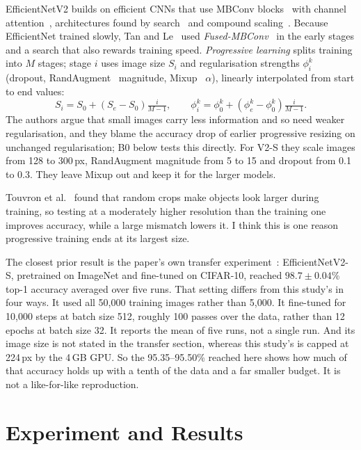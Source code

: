 \documentclass{COMPXXXX}
\begin{document}
EfficientNetV2 builds on efficient CNNs that use MBConv blocks~\cite{sandler2018mobilenetv2} with
channel attention~\cite{hu2018squeeze}, architectures found by search~\cite{tan2019mnasnet,howard2019searching}
and compound scaling~\cite{tan2019efficientnet}. Because EfficientNet trained slowly, Tan and
Le~\cite{tan2021efficientnetv2} used \emph{Fused-MBConv}~\cite{gupta2020accelerator} in the early
stages and a search that also rewards training speed. \emph{Progressive learning} splits training into
$M$ stages; stage $i$ uses image size $S_i$ and regularisation strengths $\phi_i^{k}$ (dropout,
RandAugment~\cite{cubuk2020randaugment} magnitude, Mixup~\cite{zhang2018mixup} $\alpha$), linearly
interpolated from start to end values:
\begin{equation}
S_i = S_0 + (S_e - S_0)\tfrac{i}{M-1},\qquad
\phi_i^{k} = \phi_0^{k} + (\phi_e^{k}-\phi_0^{k})\tfrac{i}{M-1}.
\label{eq:prog}
\end{equation}
The authors argue that small images carry less information and so need weaker regularisation, and
they blame the accuracy drop of earlier progressive resizing on unchanged regularisation; B0 below
tests this directly. For V2-S they scale images from 128 to 300\,px, RandAugment magnitude from 5 to 15
and dropout from 0.1 to 0.3. They leave Mixup out and keep it for the larger models.

Touvron et al.~\cite{touvron2019fixing} found that random crops make objects look larger during
training, so testing at a moderately higher resolution than the training one improves accuracy, while
a large mismatch lowers it. I think this is one reason progressive training ends at its largest size.

The closest prior result is the paper's own transfer experiment~\cite[Table~8]{tan2021efficientnetv2}:
EfficientNetV2-S, pretrained on ImageNet and fine-tuned on CIFAR-10, reached $98.7\pm0.04$\% top-1
accuracy averaged over five runs. That setting differs from this study's in four ways. It used all
50{,}000 training images rather than 5{,}000. It fine-tuned for 10{,}000 steps at batch size 512,
roughly 100 passes over the data, rather than 12 epochs at batch size 32. It reports the mean of five
runs, not a single run. And its image size is not stated in the transfer section, whereas this study's
is capped at 224\,px by the 4\,GB GPU. So the 95.35--95.50\% reached here shows how much of that
accuracy holds up with a tenth of the data and a far smaller budget. It is not a like-for-like
reproduction.

\section{Experiment and Results}
\end{document}
